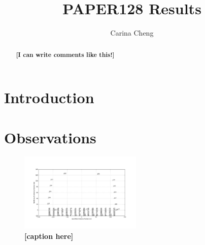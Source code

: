 \documentclass[preprint2,numberedappendix,tighten,twocolappendix]{aastex6}  %
\newcommand{\cc}[1]{{\color{purple} \textbf{[#1]}}}
\begin{document}
\title{PAPER128 Results}

\author{
Carina Cheng
}


\begin{abstract}
\cc{I can write comments like this!}
\end{abstract}


\section{Introduction}
\label{sec:Intro}

	




\section{Observations}
\label{sec:Obs}

\begin{figure}[!]
	\centering
	\includegraphics[width=0.52\textwidth]{antlayout.png}
	\caption{\cc{caption here}}
	\label{fig:figtest}
\end{figure}
\end{document}
